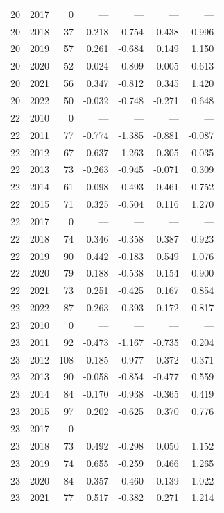 \begin{longtable}{llrrrrr}
20 & 2017 & 0 & --- & --- & --- & --- \\
20 & 2018 & 37 & 0.218 & -0.754 & 0.438 & 0.996 \\
20 & 2019 & 57 & 0.261 & -0.684 & 0.149 & 1.150 \\
20 & 2020 & 52 & -0.024 & -0.809 & -0.005 & 0.613 \\
20 & 2021 & 56 & 0.347 & -0.812 & 0.345 & 1.420 \\
20 & 2022 & 50 & -0.032 & -0.748 & -0.271 & 0.648 \\
22 & 2010 & 0 & --- & --- & --- & --- \\
22 & 2011 & 77 & -0.774 & -1.385 & -0.881 & -0.087 \\
22 & 2012 & 67 & -0.637 & -1.263 & -0.305 & 0.035 \\
22 & 2013 & 73 & -0.263 & -0.945 & -0.071 & 0.309 \\
22 & 2014 & 61 & 0.098 & -0.493 & 0.461 & 0.752 \\
22 & 2015 & 71 & 0.325 & -0.504 & 0.116 & 1.270 \\
22 & 2017 & 0 & --- & --- & --- & --- \\
22 & 2018 & 74 & 0.346 & -0.358 & 0.387 & 0.923 \\
22 & 2019 & 90 & 0.442 & -0.183 & 0.549 & 1.076 \\
22 & 2020 & 79 & 0.188 & -0.538 & 0.154 & 0.900 \\
22 & 2021 & 73 & 0.251 & -0.425 & 0.167 & 0.854 \\
22 & 2022 & 87 & 0.263 & -0.393 & 0.172 & 0.817 \\
23 & 2010 & 0 & --- & --- & --- & --- \\
23 & 2011 & 92 & -0.473 & -1.167 & -0.735 & 0.204 \\
23 & 2012 & 108 & -0.185 & -0.977 & -0.372 & 0.371 \\
23 & 2013 & 90 & -0.058 & -0.854 & -0.477 & 0.559 \\
23 & 2014 & 84 & -0.170 & -0.938 & -0.365 & 0.419 \\
23 & 2015 & 97 & 0.202 & -0.625 & 0.370 & 0.776 \\
23 & 2017 & 0 & --- & --- & --- & --- \\
23 & 2018 & 73 & 0.492 & -0.298 & 0.050 & 1.152 \\
23 & 2019 & 74 & 0.655 & -0.259 & 0.466 & 1.265 \\
23 & 2020 & 84 & 0.357 & -0.460 & 0.139 & 1.022 \\
23 & 2021 & 77 & 0.517 & -0.382 & 0.271 & 1.214 \\

\end{longtable}
